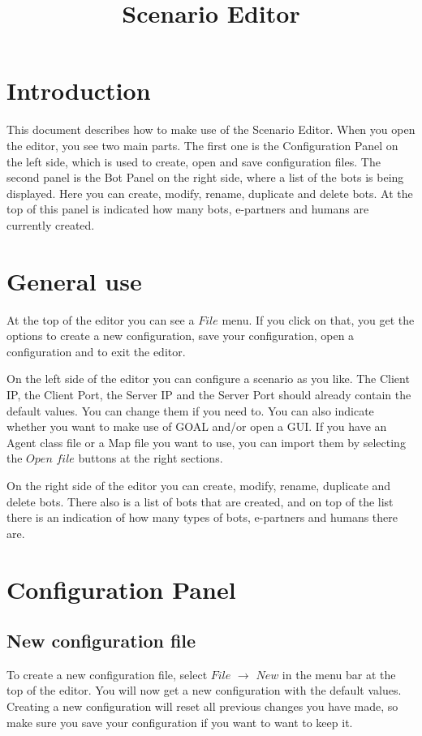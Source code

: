 \documentclass[a4paper]{article}
\title{Scenario Editor}
\date{}
\begin{document}
\maketitle
\newpage

\tableofcontents
\newpage

\section{Introduction}
This document describes how to make use of the Scenario Editor. When you open the editor, you see two main parts. The first one is the Configuration Panel on the left side, which is used to create, open and save configuration files. The second panel is the Bot Panel on the right side, where a list of the bots is being displayed. Here you can create, modify, rename, duplicate and delete bots. At the top of this panel is indicated how many bots, e-partners and humans are currently created.

\section{General use}
At the top of the editor you can see a $File$ menu. If you click on that, you get the options to create a new configuration, save your configuration, open a configuration and to exit the editor.

On the left side of the editor you can configure a scenario as you like. The Client IP, the Client Port, the Server IP and the Server Port should already contain the default values. You can change them if you need to. You can also indicate whether you want to make use of GOAL and/or open a GUI. If you have an Agent class file or a Map file you want to use, you can import them by selecting the $Open$ $file$ buttons at the right sections.

On the right side of the editor you can create, modify, rename, duplicate and delete bots. There also is a list of bots that are created, and on top of the list there is an indication of how many types of bots, e-partners and humans there are.

\section{Configuration Panel}
\subsection{New configuration file}
To create a new configuration file, select $File$ $\to$ $New$ in the menu bar at the top of the editor. You will now get a new configuration with the default values. Creating a new configuration will reset all previous changes you have made, so make sure you save your configuration if you want to want to keep it.
\end{document}
